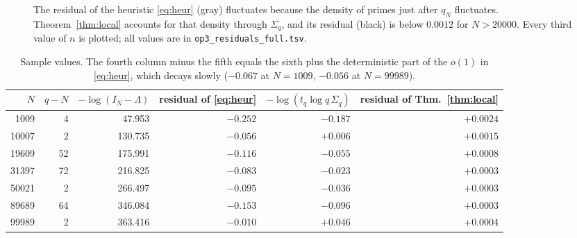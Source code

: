 \documentclass[11pt]{article}
\theoremstyle{remark}
\begin{document}
\begin{figure}[t]
\centering
{}
\caption{The residual of the heuristic \eqref{eq:heur} (gray) fluctuates because the
density of primes just after $q_N$ fluctuates. Theorem~\ref{thm:local} accounts for that
density through $\Sigma_q$, and its residual (black) is below $0.0012$ for $N>20000$. Every
third value of $n$ is plotted; all values are in \texttt{op3\_residuals\_full.tsv}.}
\label{fig:op3}
\end{figure}

\begin{table}[t]
\centering\small
\begin{tabular}{rrrrrr}
\toprule
$N$ & $q-N$ & $-\log(I_N-\Lambda)$ & residual of \eqref{eq:heur} &
$-\log(t_q\log q\,\Sigma_q)$ & residual of Thm.~\ref{thm:local}\\
\midrule
1009 & 4 & 47.953 & $-0.252$ & $-0.187$ & $+0.0024$\\
10007 & 2 & 130.735 & $-0.056$ & $+0.006$ & $+0.0015$\\
19609 & 52 & 175.991 & $-0.116$ & $-0.055$ & $+0.0008$\\
31397 & 72 & 216.825 & $-0.083$ & $-0.023$ & $+0.0003$\\
50021 & 2 & 266.497 & $-0.095$ & $-0.036$ & $+0.0003$\\
89689 & 64 & 346.084 & $-0.153$ & $-0.096$ & $+0.0003$\\
99989 & 2 & 363.416 & $-0.010$ & $+0.046$ & $+0.0004$\\
\bottomrule
\end{tabular}
\caption{Sample values. The fourth column minus the fifth equals the sixth plus the
deterministic part of the $o(1)$ in \eqref{eq:heur}, which decays slowly ($-0.067$ at $N=1009$,
$-0.056$ at $N=99989$).}
\label{tab:op3}
\end{table}
\end{document}
